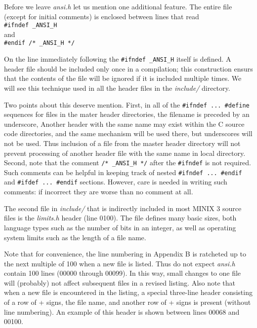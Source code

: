 \documentclass{book}
\newcommand {\sys} [1] {\textsl{#1}}
\newcommand {\cmd} [1] {\texttt{#1}}
\begin{document}
Before we leave \sys{ansi.h} let us mention one additional feature.
The entire file (except for initial comments) is enclosed between lines that read\\
\cmd{\#ifndef \_ANSI\_H}\\
and\\
\cmd{\#endif /* \_ANSI\_H */}

On the line immediately following the \cmd{\#ifndef \_ANSI\_H} itself is defined.
A header file should be included only once in a compilation;
this construction ensurs that the contents of the file will be ignored if it is included multiple times.
We will see this technique used in all the header files in the \sys{include/} directory.

Two points about this deserve mention.
First, in all of the \cmd{\#ifndef ... \#define} sequences for files in the mater header directories,
the filename is preceded by an underscore,
Another header with the same name may exist within the C source code directories,
and the same mechanism will be used there, but underscores will not be used.
Thus inclusion of a file from the master header directory will not prevent processing of another header file with the same name in local directory.
Second, note that the comment \cmd{/* \_ANSI\_H */} after the \cmd{\#ifndef} is not required.
Such comments can be helpful in keeping track of nested \cmd{\#ifndef ... \#endif} and \cmd{\#ifdef ... \#endif} sections.
However, care is needed in writing such comments: if incorrect they are worse than no comment at all.

The second file in \sys{include/} that is indirectly included in most MINIX 3 source files is the \sys{limits.h} header (line 0100).
The file defines many basic sizes, both language types such as the number of bits in an integer,
as well as operating system limits such as the length of a file name.

Note that for convenience, the line numbering in Appendix B is ratcheted up to the next multiple of 100 when a new file is listed.
Thus do not expect \sys{ansi.h} contain 100 lines (00000 through 00099).
In this way, small changes to one file will (probably) not affect subsequent files in a revised listing.
Also note that when a new file is encountered in the listing,
a special three-line header consisting of a row of + signs, the file name, and another row of + signs is present (without line numbering).
An example of this header is shown between lines 00068 and 00100.
\end{document}

